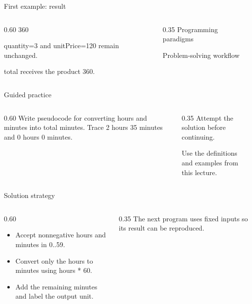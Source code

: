 \documentclass[10pt,aspectratio=169]{beamer}
\begin{document}
\begin{frame}[fragile,t]{First example: result}
\begin{columns}[T,onlytextwidth]\begin{column}{0.60\textwidth}
360\par quantity=3 and unitPrice=120 remain unchanged.\par total receives the product 360.
\end{column}\begin{column}{0.35\textwidth}\small
Programming paradigms

Problem-solving workflow
\end{column}\end{columns}
\end{frame}

\begin{frame}[fragile,t]{Guided practice}
\begin{columns}[T,onlytextwidth]\begin{column}{0.60\textwidth}
Write pseudocode for converting hours and minutes into total minutes. Trace 2 hours 35 minutes and 0 hours 0 minutes.
\end{column}\begin{column}{0.35\textwidth}\small
Attempt the solution before continuing.

Use the definitions and examples from this lecture.
\end{column}\end{columns}
\end{frame}

\begin{frame}[fragile,t]{Solution strategy}
\begin{columns}[T,onlytextwidth]\begin{column}{0.60\textwidth}
\begin{itemize}
\item Accept nonnegative hours and minutes in 0..59.
\item Convert only the hours to minutes using hours * 60.
\item Add the remaining minutes and label the output unit.
\end{itemize}
\end{column}\begin{column}{0.35\textwidth}\small
The next program uses fixed inputs so its result can be reproduced.
\end{column}\end{columns}
\end{frame}
\end{document}
